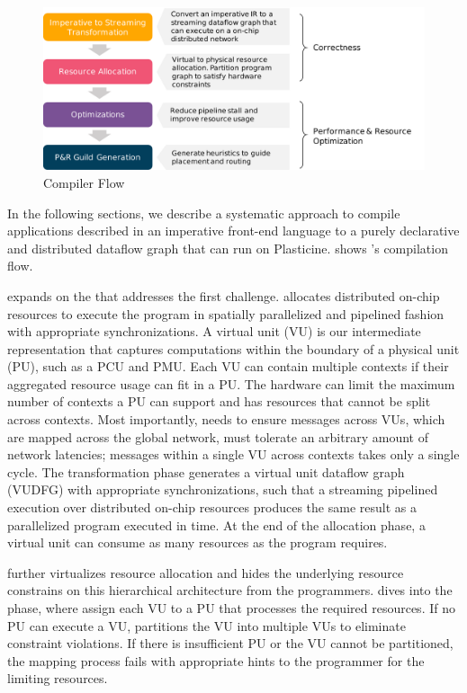 \begin{figure}
\centering
\includegraphics[width=1\textwidth]{figs/sarastack.pdf}
\caption[\name Compiler Flow]{\name Compiler Flow}
\label{fig:flow}
\end{figure}
 
In the following sections, we describe a systematic approach to compile applications described in an
imperative front-end language to a purely declarative and distributed dataflow graph that can
run on Plasticine.  shows \name's compilation flow.

 expands on the  that
addresses the first challenge.
\name allocates distributed on-chip resources to execute the program in spatially parallelized and
pipelined fashion with appropriate synchronizations.
A virtual unit (VU) is our intermediate representation that captures computations 
within the boundary of
a physical unit (PU), such as a PCU and PMU.
Each VU can contain multiple contexts if their aggregated resource usage can fit in a PU.
The hardware can limit the maximum number of contexts a PU can support and has resources that cannot be split across contexts.
Most importantly, \name needs to ensure messages across VUs, which are mapped across the global network, must tolerate an arbitrary amount of network latencies; messages within a single VU across contexts takes only a single cycle.
The transformation phase generates a virtual unit dataflow graph (VUDFG) with appropriate
synchronizations, such that a streaming pipelined execution over distributed on-chip resources produces the same result as a
parallelized program executed in time.
At the end of the allocation phase, a virtual unit can consume as many resources as the program
requires. 

\name further virtualizes resource allocation and hides the underlying resource constrains on
this hierarchical architecture from the programmers.
 dives into the  phase, where \name assign each VU to a
PU that processes the required resources. If no PU can execute a VU, \name partitions the
VU into multiple VUs to eliminate constraint violations. If there is insufficient PU or the VU cannot be partitioned, the mapping process fails with appropriate hints to the programmer for the
limiting resources.


